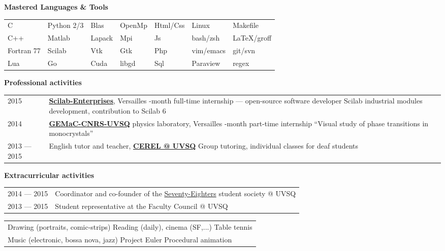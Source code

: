 \documentclass[pdftex,a4paper,10pt]{article}
\begin{document}
{\large\bf Mastered Languages \& Tools}
\hrulefill\\[.2cm]
\begin{tabularx}{\textwidth}{XX|XX|X|XX}
C          & Python 2/3   & {\sc Blas}   & Open{\sc Mp} & {\sc Html/Css} & Linux     & Makefile \\
C++        & {\sc Matlab} & {\sc Lapack} & {\sc Mpi}    & {\sc Js}       & bash/zsh  & \LaTeX/groff \\
Fortran 77 & Scilab       & {\sc Vtk}    & {\sc Gtk}    & {\sc Php}      & vim/emacs & git/svn \\
Lua        & Go           & {\sc Cuda}   & libgd        & {\sc Sql}      & Paraview  & regex
\end{tabularx}
\vspace{.8cm}

{\large\bf Professional activities}
\hrulefill\\[.2cm]
{\setlength{\extrarowheight}{.2cm}
\begin{tabularx}{\textwidth}{lX}
2015 &
\href{http://www.scilab-enterprises.com}
{\bf Scilab-Enterprises}, Versailles
\newline
4-month full-time internship \---- open-source software developer
\newline
Scilab industrial modules development, contribution to Scilab 6
\\
2014 &
\href{http://www.gemac.uvsq.fr/}
{\bf GEMaC-CNRS-UVSQ} physics laboratory, Versailles
\newline
6-month part-time internship
\newline
``Visual study of phase transitions in monocrystals''\\
2013 \---- 2015 &
English tutor and teacher,
\href{http://www.cerel.uvsq.fr/presentation-291090.kjsp}
{\bf CEREL \makeatletter @ \makeatother UVSQ}
\newline
Group tutoring, individual classes for deaf students\
\end{tabularx}}
\vspace{.4cm}

{\large\bf Extracurricular activities}
\hrulefill\\[.3cm]
{\setlength{\extrarowheight}{.15cm}
\begin{tabularx}{\textwidth}{lX}
2014 \---- 2015 &
Coordinator and co-founder of the
\href{https://www.facebook.com/pages/Seventy-Eighters/508772502567015}
{Seventy-Eighters} student society
\makeatletter @ \makeatother UVSQ \\
2013 \---- 2015 &
Student representative at the Faculty Council
\makeatletter @ \makeatother UVSQ
\end{tabularx}}
\newline
{\setlength{\extrarowheight}{.15cm}
\begin{tabularx}{\textwidth}{X}
Drawing (portraits, comic-strips) \hfill
Reading (daily), cinema (SF,...) \hfill
Table tennis \\
Music (electronic, bossa nova, jazz) \hfill
Project Euler \hfill
Procedural animation
\end{tabularx}}
\end{document}
